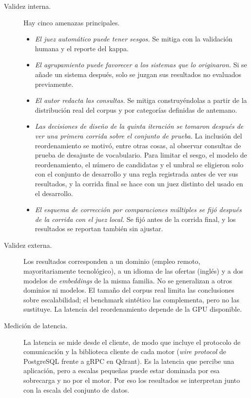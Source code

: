 \begin{description}
    \item[Validez interna.] Hay cinco amenazas principales.
    \begin{itemize}
        \item \emph{El juez automático puede tener sesgos.} Se mitiga con la validación humana y el reporte del kappa.
        \item \emph{El agrupamiento puede favorecer a los sistemas que lo originaron.} Si se añade un sistema después, solo se juzgan sus resultados no evaluados previamente.
        \item \emph{El autor redacta las consultas.} Se mitiga construyéndolas a partir de la distribución real del corpus y por categorías definidas de antemano.
        \item \emph{Las decisiones de diseño de la quinta iteración se tomaron después de ver una primera corrida sobre el conjunto de prueba.} La inclusión del reordenamiento se motivó, entre otras cosas, al observar consultas de prueba de desajuste de vocabulario. Para limitar el sesgo, el modelo de reordenamiento, el número de candidatas y el umbral se eligieron solo con el conjunto de desarrollo y una regla registrada antes de ver sus resultados, y la corrida final se hace con un juez distinto del usado en el desarrollo.
        \item \emph{El esquema de corrección por comparaciones múltiples se fijó después de la corrida con el juez local.} Se fijó antes de la corrida final, y los resultados se reportan también sin ajustar.
    \end{itemize}
    \item[Validez externa.] Los resultados corresponden a un dominio (empleo remoto, mayoritariamente tecnológico), a un idioma de las ofertas (inglés) y a dos modelos de \textit{embeddings} de la misma familia. No se generalizan a otros dominios ni modelos. El tamaño del corpus real limita las conclusiones sobre escalabilidad; el benchmark sintético las complementa, pero no las sustituye. La latencia del reordenamiento depende de la GPU disponible.
    \item[Medición de latencia.] La latencia se mide desde el cliente, de modo que incluye el protocolo de comunicación y la biblioteca cliente de cada motor (\textit{wire protocol} de PostgreSQL frente a gRPC en Qdrant). Es la latencia que percibe una aplicación, pero a escalas pequeñas puede estar dominada por esa sobrecarga y no por el motor. Por eso los resultados se interpretan junto con la escala del conjunto de datos.

\end{description}
